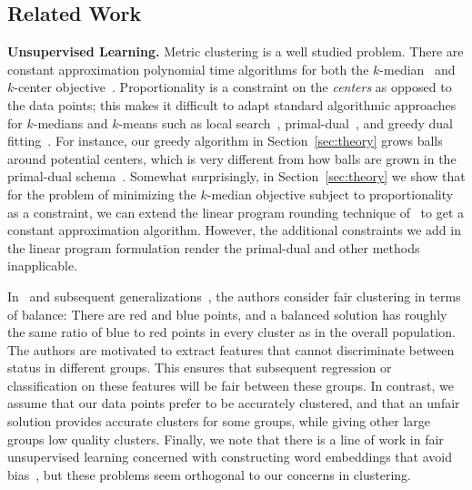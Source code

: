 

\subsection{Related Work}
\textbf{Unsupervised Learning.} Metric clustering is a well studied problem. There are constant approximation polynomial time algorithms for both the $k$-median~\cite{kMedianPrimalDual, kMedianLP, kmedians, mettuPlaxton, BPRST17} and $k$-center objective~\cite{kcenter, STA97}.  Proportionality is a constraint on the {\em centers} as opposed to the data points; this makes it difficult to adapt standard algorithmic approaches for $k$-medians and $k$-means such as local search~\cite{kmedians}, primal-dual~\cite{kMedianPrimalDual}, and greedy dual fitting~\cite{kMedianApprox}. For instance, our greedy algorithm in Section~\ref{sec:theory} grows balls around potential centers, which is very different from how balls are grown in the primal-dual schema~\cite{kMedianPrimalDual, mettuPlaxton}. Somewhat surprisingly, in Section~\ref{sec:theory} we show that for the problem of minimizing the $k$-median objective subject to proportionality as a constraint, we can extend the linear program rounding technique of~\cite{kMedianLP} to get a constant approximation algorithm. However, the additional constraints we add in the linear program formulation render the primal-dual and other methods inapplicable.

In~\cite{fairlets} and subsequent generalizations~\cite{RS45, BCN19}, the authors consider fair clustering in terms of balance: There are red and blue points, and a balanced solution has roughly the same ratio of blue to red points in every cluster as in the overall population. The authors are motivated to extract features that cannot discriminate between status in different groups. This ensures that subsequent regression or classification on these features will be fair between these groups. In contrast, we assume that our data points prefer to be accurately clustered, and that an unfair solution provides accurate clusters for some groups, while giving other large groups low quality clusters. Finally, we note that there is a line of work in fair unsupervised learning concerned with constructing word embeddings that avoid bias~\cite{manWoman, biasScience}, but these problems seem orthogonal to our concerns in clustering.

